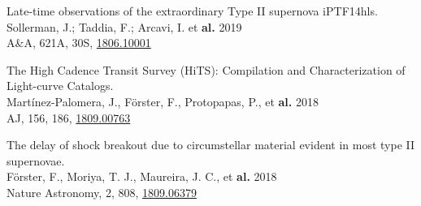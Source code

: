 \documentclass[12pt]{article}
\begin{document}
\begin{bibenum}
\item 
Late-time observations of the extraordinary Type II supernova iPTF14hls.\\
Sollerman, J.; Taddia, F.; Arcavi, I.  et \textbf{al.} 2019\\
A\&A, 621A, 30S, \href{https://arxiv.org/abs/1806.10001}{1806.10001}

\item 
The High Cadence Transit Survey (HiTS): Compilation and Characterization of Light-curve Catalogs.\\
Mart\'inez-Palomera, J., F\"orster, F., Protopapas, P.,  et \textbf{al.} 2018\\
AJ, 156, 186, \href{https://arxiv.org/abs/1809.00763}{1809.00763}

\item 
The delay of shock breakout due to circumstellar material evident in most type II supernovae.\\
F\"orster, F., Moriya, T. J., Maureira, J. C.,  et \textbf{al.} 2018\\
Nature Astronomy, 2, 808, \href{https://arxiv.org/abs/1809.06379}{1809.06379}


\end{bibenum}
\end{document}
